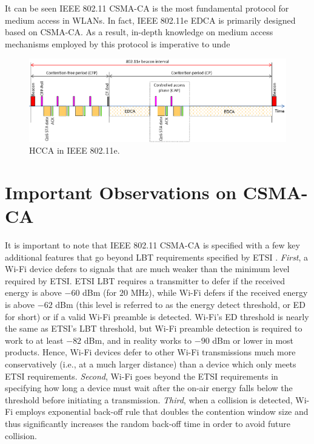 It can be seen IEEE 802.11 CSMA-CA is the most fundamental protocol for medium access in WLANs. In fact, IEEE 802.11e EDCA is primarily designed based on CSMA-CA. As a result, in-depth knowledge on medium access mechanisms employed by this protocol is imperative to unde
\begin{figure}[!t]
	\centering
	\includegraphics[width=1.0\columnwidth]{figures2/802-11e-HCCA}
	\caption{HCCA in IEEE 802.11e.}
	\label{figs:802-11e-HCCA}
\end{figure}

\section{Important Observations on CSMA-CA}
\label{csmaca-obs}
It is important to note that IEEE 802.11 CSMA-CA is specified with a few key additional features that go beyond LBT requirements specified by ETSI \cite{LBT-ETSI-2014}. \textit{First}, a Wi-Fi device defers to signals that are much weaker than the minimum level required by ETSI. ETSI LBT requires a transmitter to defer if the received energy is above $-60$ dBm (for $20$ MHz), while Wi-Fi defers if the received energy is above $-62$ dBm (this level is referred to as the energy detect threshold, or ED for short) or if a valid Wi-Fi preamble is detected. Wi-Fi's ED threshold is nearly the same as ETSI's LBT threshold, but Wi-Fi preamble detection is required to work to at least $-82$ dBm, and in reality works to $-90$ dBm or lower in most products. Hence, Wi-Fi devices defer to other Wi-Fi transmissions much more conservatively (i.e., at a much larger distance) than a device which only meets ETSI requirements. \textit{Second}, Wi-Fi goes beyond the ETSI requirements in specifying how long a device must wait after the on-air energy falls below the threshold before initiating a transmission. \textit{Third}, when a collision is detected, Wi-Fi employs exponential back-off rule that doubles the contention window size and thus significantly increases the random back-off time in order to avoid future collision.

